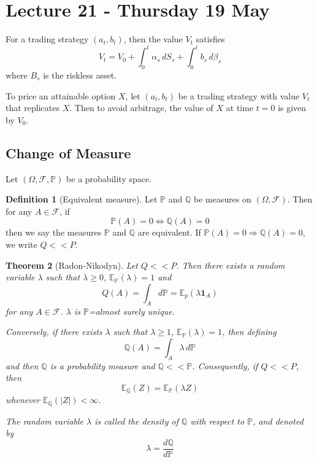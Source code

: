 \documentclass[10pt, oneside, reqno]{amsart}
\theoremstyle{plain}%
\newtheorem{thm}{Theorem}[section]
\theoremstyle{definition}
\newtheorem{defn}[thm]{Definition}
\theoremstyle{remark}
\newcommand{\Q}{\mathbb{Q}}
\renewcommand{\P}{\mathbb{P}}
\newcommand{\E}{\mathbb{E}}
\newcommand{\sigf}{\mathcal{F}}
\begin{document}
\section{Lecture 21 - Thursday 19 May} %
\label{sec:lecture_21_thursday_19_may}


For a trading strategy $(a_t, b_t)$, then the value $V_t$ satisfies \[
    V_t = V_0 + \int_0^t \alpha_s \, dS_s + \int_0^t b_s \, d\beta_s
\] where $B_s$ is the riskless asset.

To price an attainable option $X$, let $(a_t, b_t)$ be a trading strategy with value $V_t$ that replicates $X$. Then to avoid arbitrage, the value of $X$ at time $t = 0$ is given by $V_0$.

\subsection{Change of Measure} %
\label{sec:change_of_measure}
Let $(\Omega, \sigf, \P)$ be a probability space.

\begin{defn}[Equivalent measure]
    
    
Let $\P$ and $\Q$ be measures on $(\Omega, \sigf)$.  Then for any $A \in \sigf$, if \[
\P(A) = 0 \iff \Q(A) = 0
\] then we say the measures $\P$ and $\Q$ are equivalent.  If $\P(A) = 0 \Rightarrow \Q(A) = 0$, we write $Q << P$. 
\end{defn}  

\begin{thm}[Radon-Nikodyn]
    Let $Q << P$.  Then there exists a random variable $\lambda$ such that $\lambda \geq 0$, $\E_\P(\lambda) = 1$ and \[
        Q(A) = \int_A d\P = \E_p (\lambda \mathbf{1}_A) 
    \] for any $A \in \sigf$.  $\lambda$ is $\P$=almost surely unique. 
    
    Conversely, if there exists $\lambda$ such that $\lambda \geq 1$, $\E_\P (\lambda) = 1$, then defining \[
        \Q(A) = \int_A \lambda \, d\P
    \] and then $\Q$ is a probability measure and $\Q << \P$.  Consequently, if $Q << P$, then \[
        \E_\Q(Z) = \E_\P(\lambda Z)
    \] whenever $\E_\Q(|Z|) < \infty$.  
    
    The random variable $\lambda$ is called the density of $\Q$ with respect to $\P$, and denoted by \[
        \lambda = \frac{d\Q}{d\P}
    \]
\end{thm}
\end{document}
